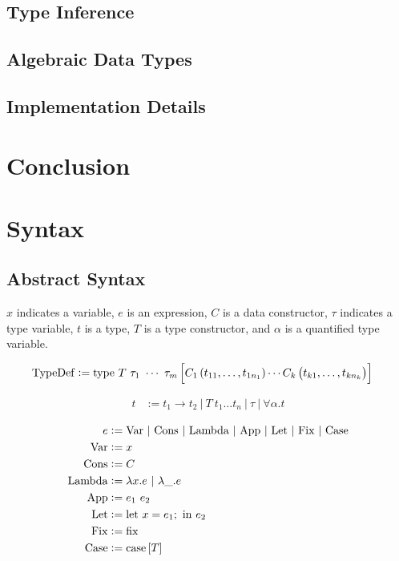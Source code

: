 \documentclass[12pt]{article}
\begin{document}
\subsection{Type Inference}


\subsection{Algebraic Data Types}

\subsection{Implementation Details}


\section{Conclusion}


\printbibliography


\pagebreak


\appendix

\section{Syntax}
\label{app:syntax}

\subsection{Abstract Syntax}

$x$ indicates a variable, $e$ is an expression, $C$ is a data
constructor, $\tau$ indicates a type variable, $t$ is a type, $T$ is a
type constructor, and $\alpha$ is a quantified type variable.

\begin{align}
  \mathrm{TypeDef} &:= \mathrm{type}~T~\tau_1~\cdots~\tau_m \sbr{
                     C_1\del{t_{11},\ldots,t_{1n_1}} 
                     \cdots
                     C_k\del{t_{k1},\ldots,t_{kn_k}}
                     } \label{eq:typedef}
\end{align}

\begin{align}
  t &:= t_1 \to t_2 ~|~ T~t_1 \ldots t_n ~|~ \tau ~|~ \forall \alpha. t
\end{align}

\begin{align}
  e &:= \mathrm{Var} ~|~ \mathrm{Cons} ~|~ \mathrm{Lambda} ~|~ \mathrm{App} ~|~ \mathrm{Let} ~|~ \mathrm{Fix} ~|~ \mathrm{Case}\\
  \mathrm{Var} &:= x\\
  \mathrm{Cons} &:= C\\
  \mathrm{Lambda} &:= \lambda x. e ~|~ \lambda \_. e\\
  \mathrm{App} &:= e_1~e_2\\
  \mathrm{Let} &:= \mathrm{let}~x = e_1;~\mathrm{in}~e_2\\
  \mathrm{Fix} &:= \mathrm{fix}\\
  \mathrm{Case} &:= \mathrm{case}\sbr{T}
\end{align}
\end{document}
